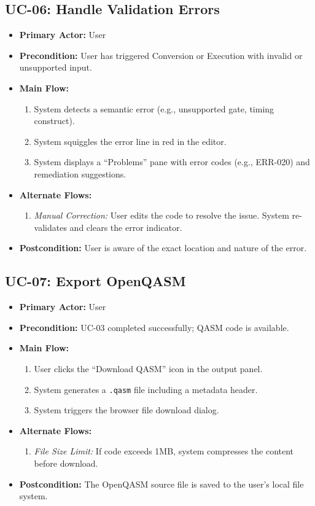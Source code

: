 \subsection{UC-06: Handle Validation Errors}
\begin{itemize}
    \item \textbf{Primary Actor:} User
    \item \textbf{Precondition:} User has triggered Conversion or Execution with invalid or unsupported input.
    \item \textbf{Main Flow:}
    \begin{enumerate}
        \item System detects a semantic error (e.g., unsupported gate, timing construct).
        \item System squiggles the error line in red in the editor.
        \item System displays a ``Problems'' pane with error codes (e.g., ERR-020) and remediation suggestions.
    \end{enumerate}
    \item \textbf{Alternate Flows:}
    \begin{enumerate}
        \item [3a] \textit{Manual Correction:} User edits the code to resolve the issue. System re-validates and clears the error indicator.
    \end{enumerate}
    \item \textbf{Postcondition:} User is aware of the exact location and nature of the error.
\end{itemize}

\subsection{UC-07: Export OpenQASM}
\begin{itemize}
    \item \textbf{Primary Actor:} User
    \item \textbf{Precondition:} UC-03 completed successfully; QASM code is available.
    \item \textbf{Main Flow:}
    \begin{enumerate}
        \item User clicks the ``Download QASM'' icon in the output panel.
        \item System generates a \texttt{.qasm} file including a metadata header.
        \item System triggers the browser file download dialog.
    \end{enumerate}
    \item \textbf{Alternate Flows:}
    \begin{enumerate}
        \item [3a] \textit{File Size Limit:} If code exceeds 1MB, system compresses the content before download.
    \end{enumerate}
    \item \textbf{Postcondition:} The OpenQASM source file is saved to the user's local file system.
\end{itemize}

